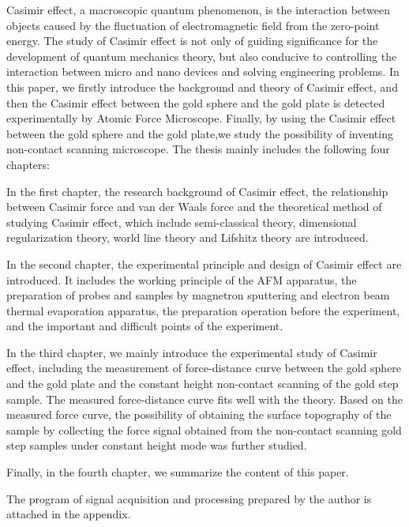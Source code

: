 \begin{enabstract}
  Casimir effect, a macroscopic quantum phenomenon, is the interaction between objects caused by the fluctuation of electromagnetic field from the zero-point energy.  The study of Casimir effect is not only of guiding significance for the development of quantum mechanics theory, but also conducive to controlling the interaction between micro and nano devices and solving engineering problems.  In this paper, we firstly introduce the background and theory of Casimir effect, and then the Casimir effect between the gold sphere and the gold plate is detected experimentally by Atomic Force Microscope. Finally, by using the Casimir effect between the gold sphere and the gold plate,we study the possibility of inventing non-contact scanning microscope. The thesis mainly includes the following four chapters:  
 
 
  In the first chapter, the research background of Casimir effect, the relationship between Casimir force and van der Waals force and the theoretical method of studying Casimir effect, which include semi-classical theory, dimensional regularization theory, world line theory and Lifshitz theory are introduced.
   
   
  In the second chapter, the experimental principle and design of Casimir effect are introduced.  It includes the working principle of the AFM apparatus, the preparation of probes and samples by magnetron sputtering and electron beam thermal evaporation apparatus, the preparation operation before the experiment, and the important and difficult points of the experiment.  
   
   
  In the third chapter, we mainly introduce the experimental study of Casimir effect, including the measurement of force-distance curve between the gold sphere and the gold plate and the constant height non-contact scanning of the gold step sample.  The measured force-distance curve fits well with the theory. Based on the measured force curve, the possibility of obtaining the surface topography of the sample by collecting the force signal obtained from the non-contact scanning gold step samples under constant height mode was further studied.  
   
   
  Finally, in the fourth chapter, we summarize the content of this paper.   


  The program of signal acquisition and processing prepared by the author is attached in the appendix.
\end{enabstract}
